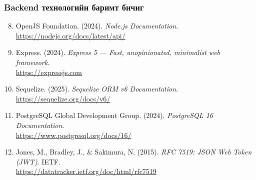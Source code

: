 \subsubsection*{Backend технологийн баримт бичиг}

\begin{enumerate}
  \setcounter{enumi}{7}
  \item OpenJS Foundation. (2024). \textit{Node.js Documentation}. \\
        \url{https://nodejs.org/docs/latest/api/}
  \item Express. (2024). \textit{Express 5 --- Fast, unopinionated, minimalist web framework}. \\
        \url{https://expressjs.com}
  \item Sequelize. (2025). \textit{Sequelize ORM v6 Documentation}. \\
        \url{https://sequelize.org/docs/v6/}
  \item PostgreSQL Global Development Group. (2024). \textit{PostgreSQL 16 Documentation}. \\
        \url{https://www.postgresql.org/docs/16/}
  \item Jones, M., Bradley, J., \& Sakimura, N. (2015). \textit{RFC 7519: JSON Web Token (JWT)}. IETF. \\
        \url{https://datatracker.ietf.org/doc/html/rfc7519}
\end{enumerate}



